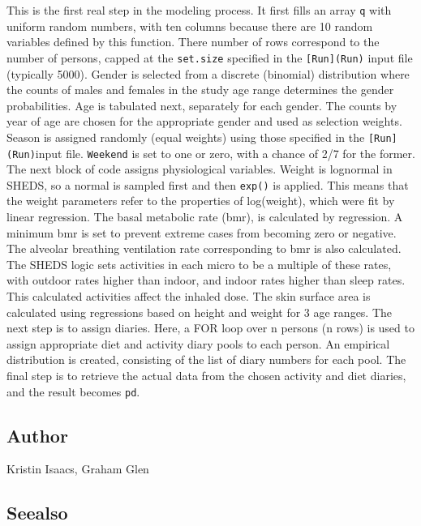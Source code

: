 \documentclass[
]{article}
\begin{document}
This is the first real step in the modeling process. It first fills an
array \texttt{q} with uniform random numbers, with ten columns because
there are 10 random variables defined by this function. There number of
rows correspond to the number of persons, capped at the
\texttt{set.size} specified in the \texttt{{[}Run{]}(Run)} input file
(typically 5000). Gender is selected from a discrete (binomial)
distribution where the counts of males and females in the study age
range determines the gender probabilities. Age is tabulated next,
separately for each gender. The counts by year of age are chosen for the
appropriate gender and used as selection weights. Season is assigned
randomly (equal weights) using those specified in the
\texttt{{[}Run{]}(Run)}input file. \texttt{Weekend} is set to one or
zero, with a chance of 2/7 for the former. The next block of code
assigns physiological variables. Weight is lognormal in SHEDS, so a
normal is sampled first and then \texttt{exp()} is applied. This means
that the weight parameters refer to the properties of log(weight), which
were fit by linear regression. The basal metabolic rate (bmr), is
calculated by regression. A minimum bmr is set to prevent extreme cases
from becoming zero or negative. The alveolar breathing ventilation rate
corresponding to bmr is also calculated. The SHEDS logic sets activities
in each micro to be a multiple of these rates, with outdoor rates higher
than indoor, and indoor rates higher than sleep rates. This calculated
activities affect the inhaled dose. The skin surface area is calculated
using regressions based on height and weight for 3 age ranges. The next
step is to assign diaries. Here, a FOR loop over n persons (n rows) is
used to assign appropriate diet and activity diary pools to each person.
An empirical distribution is created, consisting of the list of diary
numbers for each pool. The final step is to retrieve the actual data
from the chosen activity and diet diaries, and the result becomes
\texttt{pd}.

\hypertarget{author-29}{%
\subsection{Author}\label{author-29}}

Kristin Isaacs, Graham Glen

\hypertarget{seealso-22}{%
\subsection{Seealso}\label{seealso-22}}
\end{document}
